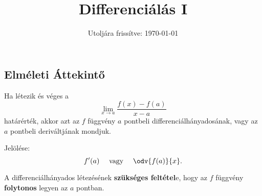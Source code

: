 \documentclass[a4paper, 12pt]{scrartcl}
\title{Differenciálás I}
\date{Utoljára frissítve: \today}
\begin{document}
\maketitle

\subsection{Elméleti Áttekintő}

\begin{definition}[Differenciálhányados]
  Ha létezik és véges a
  \[
    \lim_{x \rightarrow a} \frac{f(x) - f(a)}{x - a}
  \]
  határérték, akkor azt az $f$ függvény $a$ pontbeli differenciálhányadosának,
  vagy az $a$ pontbeli deriváltjának mondjuk.

  Jelölése:
  \[
    f'(a)
    \quad \text{ vagy } \quad
    \odv{f(a)}{x}
    \text.
  \]
\end{definition}

\begin{note}
  A differenciálhányados létezésének \textbf{szükséges feltétel}e, hogy az $f$
  függvény \textbf{folytonos} legyen az $a$ pontban.
\end{note}
\end{document}
